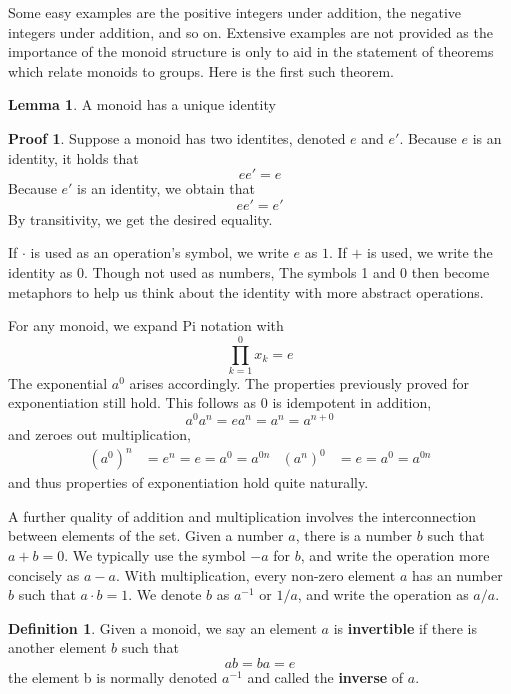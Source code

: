 \documentclass[12pt]{amsbook}
\theoremstyle{definition}
\newtheorem{lemma}[theorem]{Lemma}
\newtheorem{definition}{Definition}
\newtheorem*{prf}{Proof}
\begin{document}
Some easy examples are the positive integers under addition, the negative integers under addition, and so on. Extensive examples are not provided as the importance of the monoid structure is only to aid in the statement of theorems which relate monoids to groups. Here is the first such theorem.

\begin{lemma} A monoid has a unique identity \end{lemma}
\begin{prf}
    Suppose a monoid has two identites, denoted $e$ and $e'$. Because $e$ is an identity, it holds that
    \[ ee' = e \]
    Because $e'$ is an identity, we obtain that
    \[ ee' = e' \]
    By transitivity, we get the desired equality.
\end{prf}

If $\cdotp$ is used as an operation's symbol, we write $e$ as $1$. If $+$ is used, we write the identity as $0$. Though not used as numbers, The symbols 1 and 0 then become metaphors to help us think about the identity with more abstract operations.

For any monoid, we expand Pi notation with
%
\[ \prod_{k = 1}^0 x_k = e \]
%
The exponential $a^0$ arises accordingly. The properties previously proved for exponentiation still hold. This follows as $0$ is idempotent in addition,
%
\[a^0 a^n = e a^n = a^n = a^{n+0}\]
%
and zeroes out multiplication,
%
\begin{align*} (a^0)^n &= e^n = e = a^0 = a^{0n} & (a^n)^0 &= e = a^0 = a^{0n} \end{align*}
%
and thus properties of exponentiation hold quite naturally.

A further quality of addition and multiplication involves the interconnection between elements of the set. Given a number $a$, there is a number $b$ such that $a + b = 0$. We typically use the symbol $-a$ for $b$, and write the operation more concisely as $a - a$. With multiplication, every non-zero element $a$ has an number $b$ such that $a \cdotp b = 1$. We denote $b$ as $a^{-1}$ or $1/a$, and write the operation as $a/a$.

\begin{definition}
    Given a monoid, we say an element $a$ is {\bf invertible} if there is another element $b$ such that
    \[ ab = ba = e \]
    the element b is normally denoted $a^{-1}$ and called the {\bf inverse} of $a$.
\end{definition}
\end{document}
